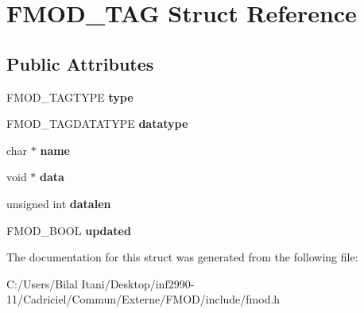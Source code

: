 \hypertarget{struct_f_m_o_d___t_a_g}{}\section{F\+M\+O\+D\+\_\+\+T\+AG Struct Reference}
\label{struct_f_m_o_d___t_a_g}
\subsection*{Public Attributes}
\begin{DoxyCompactItemize}
\item 
F\+M\+O\+D\+\_\+\+T\+A\+G\+T\+Y\+PE {\bfseries type}\hypertarget{struct_f_m_o_d___t_a_g_ad891c5f78e72ffeebc0f39e34e5b1b20}{}\label{struct_f_m_o_d___t_a_g_ad891c5f78e72ffeebc0f39e34e5b1b20}

\item 
F\+M\+O\+D\+\_\+\+T\+A\+G\+D\+A\+T\+A\+T\+Y\+PE {\bfseries datatype}\hypertarget{struct_f_m_o_d___t_a_g_acc0f4bf92ee045d5828ba7eccc3c4c23}{}\label{struct_f_m_o_d___t_a_g_acc0f4bf92ee045d5828ba7eccc3c4c23}

\item 
char $\ast$ {\bfseries name}\hypertarget{struct_f_m_o_d___t_a_g_a200d18627ec871638bb7df841a77b2ab}{}\label{struct_f_m_o_d___t_a_g_a200d18627ec871638bb7df841a77b2ab}

\item 
void $\ast$ {\bfseries data}\hypertarget{struct_f_m_o_d___t_a_g_a86247271797eb33118a5fff813c1e548}{}\label{struct_f_m_o_d___t_a_g_a86247271797eb33118a5fff813c1e548}

\item 
unsigned int {\bfseries datalen}\hypertarget{struct_f_m_o_d___t_a_g_a589281f4f1adc717798744722ec43761}{}\label{struct_f_m_o_d___t_a_g_a589281f4f1adc717798744722ec43761}

\item 
F\+M\+O\+D\+\_\+\+B\+O\+OL {\bfseries updated}\hypertarget{struct_f_m_o_d___t_a_g_a0358f4afc9957d3d3254691c3118d90a}{}\label{struct_f_m_o_d___t_a_g_a0358f4afc9957d3d3254691c3118d90a}

\end{DoxyCompactItemize}


The documentation for this struct was generated from the following file\+:\begin{DoxyCompactItemize}
\item 
C\+:/\+Users/\+Bilal Itani/\+Desktop/inf2990-\/11/\+Cadriciel/\+Commun/\+Externe/\+F\+M\+O\+D/include/fmod.\+h\end{DoxyCompactItemize}
